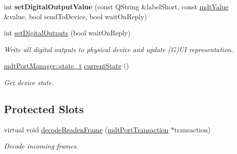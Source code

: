 \begin{DoxyCompactItemize}
\item 
\hypertarget{classmdt_device_a2377d24cc1e767a24dfc5e34454a8737}{
int {\bfseries setDigitalOutputValue} (const QString \&labelShort, const \hyperlink{classmdt_value}{mdtValue} \&value, bool sendToDevice, bool waitOnReply)}
\label{classmdt_device_a2377d24cc1e767a24dfc5e34454a8737}

\item 
int \hyperlink{classmdt_device_a7b86a816e55a91f0d62426e1741437c6}{setDigitalOutputs} (bool waitOnReply)
\begin{DoxyCompactList}\small\item\em Write all digital outputs to physical device and update (G)UI representation. \end{DoxyCompactList}\item 
\hypertarget{classmdt_device_a76ddf08ac78502b835b192a8f38f963f}{
\hyperlink{classmdt_port_manager_a9448339d7f08ca5e18b904df25b382da}{mdtPortManager::state\_\-t} \hyperlink{classmdt_device_a76ddf08ac78502b835b192a8f38f963f}{currentState} ()}
\label{classmdt_device_a76ddf08ac78502b835b192a8f38f963f}

\begin{DoxyCompactList}\small\item\em Get device state. \end{DoxyCompactList}\end{DoxyCompactItemize}
\subsection*{Protected Slots}
\begin{DoxyCompactItemize}
\item 
virtual void \hyperlink{classmdt_device_ad211ba3be781c3db0397d5bf91f796d1}{decodeReadenFrame} (\hyperlink{classmdt_port_transaction}{mdtPortTransaction} $\ast$transaction)
\begin{DoxyCompactList}\small\item\em Decode incoming frames. \end{DoxyCompactList}\end{DoxyCompactItemize}
